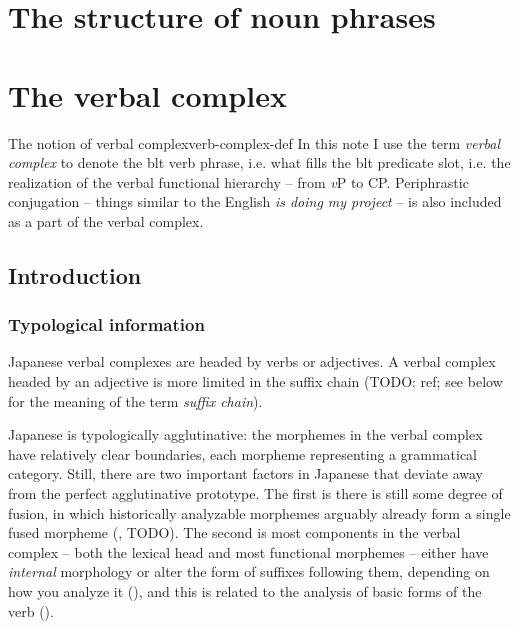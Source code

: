 \documentclass[UTF8, a4paper, oneside, scheme=plain]{ctexrep}
\newcommand*{\term}[1]{\emph{#1}}
\newcommand{\corpus}[1]{\emph{#1}}
\newcommand{\vP}{\textit{v}P}
\begin{document}
\chapter{The structure of noun phrases}

\chapter{The verbal complex}\label{chap:verb-complex}

\begin{theorybox}{The notion of verbal complex}{verb-complex-def}
    In this note I use the term \term{verbal complex} to denote the \ac{blt} verb phrase,
    i.e. what fills the \ac{blt} predicate slot,
    i.e. the realization of the verbal functional hierarchy -- from \vP{} to CP.
    Periphrastic conjugation -- things similar to the English \corpus{is doing my project} -- 
    is also included as a part of the verbal complex.
\end{theorybox}

\section{Introduction}

\subsection{Typological information}

Japanese verbal complexes are headed by verbs or adjectives.
A verbal complex headed by an adjective is more limited 
in the suffix chain (TODO: ref; see below for the meaning of the term \term{suffix chain}).

Japanese is typologically agglutinative:
the morphemes in the verbal complex have relatively clear boundaries,
each morpheme representing a grammatical category.
Still, there are two important factors in Japanese that deviate away 
from the perfect agglutinative prototype.
The first is there is still some degree of fusion, 
in which historically analyzable morphemes arguably already form a single fused morpheme 
(, TODO).
The second is most components in the verbal complex 
-- both the lexical head and most functional morphemes --
either have \emph{internal} morphology or alter the form of suffixes following them,
depending on how you analyze it (),
and this is related to the analysis of basic forms of the verb ().
\end{document}
